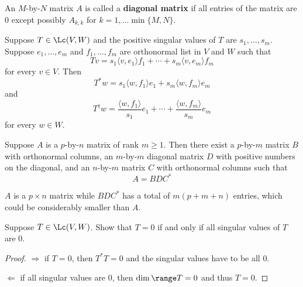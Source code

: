 \documentclass{extarticle}
\begin{document}
\begin{definition}
    An \(M\)-by-\(N\) matrix \(A\) is called a \textbf{diagonal matrix} if all entries of the matrix are 0
    except possibly \(A_{k, k}\) for \(k = 1, \ldots \min \{M, N\}\).
\end{definition}

\begin{thm}
    Suppose \(T \in \Lc(V, W)\) and the positive singular values of \(T\) are
    \(s_1, \ldots, s_m\). Suppose \(e_1, \ldots, e_m\) and \(f_1, \ldots, f_m\) are orthonormal
    list in \(V\) and \(W\) such that
    \[Tv = s_1 \langle v,e_1 \rangle f_1 + \cdots + s_m \langle v,e_m \rangle f_m\]
    for every \(v \in V\). Then
    \[T^*w = s_1 \langle w,f_1 \rangle e_1 + s_m \langle w,f_m \rangle e_m\]
    and
    \[T^\dagger w = \frac{\langle w,f_1 \rangle}{s_1}e_1 + \cdots + \frac{\langle w,f_m \rangle}{s_m}e_m\]
    for every \(w \in W\).
\end{thm}

\begin{thm}
    Suppose \(A\) is a \(p\)-by-\(n\) matrix of rank \(m \geq 1\). Then there exist a \(p\)-by-\(m\) matrix
    \(B\) with orthonormal columns, an \(m\)-by-\(m\) diagonal matrix \(D\) with positive numbers on
    the diagonal, and an \(n\)-by-\(m\) matrix \(C\) with orthonormal columns such that
    \[A = BDC^*\]
\end{thm}

\begin{remark}
    \(A\) is a \(p \times n\) matrix while \(BDC^*\) has a total of \(m(p+m+n)\) entries, which
    could be considerably smaller than \(A\).
\end{remark}


\newpage
{}

\begin{problem}{1}
    Suppose \(T \in \Lc(V, W)\). Show that \(T = 0\) if and only if all singular
    values of \(T\) are 0.
\end{problem}

\begin{proof}
\(\Rightarrow\) if \(T = 0\), then \(T^*T = 0\) and the singular values have to be all 0.

\(\Leftarrow\) if all singular values are 0, then \(\dim \range T = 0\) and thus \(T = 0\).
\end{proof}
\end{document}
